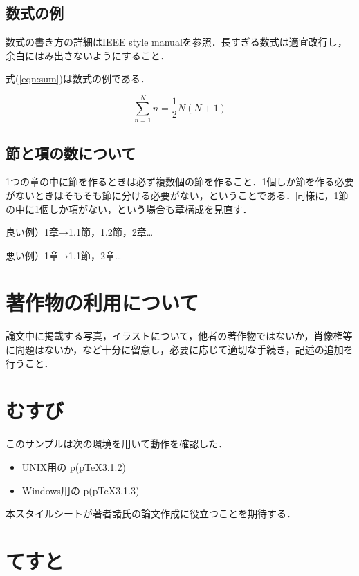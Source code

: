 \documentclass[twoside]{wiss}
\begin{document}
\subsection{数式の例}
数式の書き方の詳細はIEEE style manual\cite{IEEE2014}を参照．長すぎる数式は適宜改行し，余白にはみ出さないようにすること．

式(\ref{eqn:sum})は数式の例である．

\begin{equation}
\sum^{N}_{n=1}n = \frac{1}{2}N(N+1)
\label{eqn:sum}
\end{equation}

\subsection{節と項の数について}
1つの章の中に節を作るときは必ず複数個の節を作ること．1個しか節を作る必要がないときはそもそも節に分ける必要がない，ということである．同様に，1節の中に1個しか項がない，という場合も章構成を見直す．

良い例）1章→1.1節，1.2節，2章…

悪い例）1章→1.1節，2章…

\section{著作物の利用について}
論文中に掲載する写真，イラストについて，他者の著作物ではないか，肖像権等に問題はないか，など十分に留意し，必要に応じて適切な手続き，記述の追加を行うこと．


\section{むすび}

このサンプルは次の環境を用いて動作を確認した．
\begin{itemize}
\item UNIX用の p\LaTeXe (p\TeX3.1.2)
\item Windows用の p\LaTeXe (p\TeX3.1.3)
\end{itemize}
本スタイルシートが著者諸氏の論文作成に役立つことを期待する．


\section{てすと}
\end{document}
